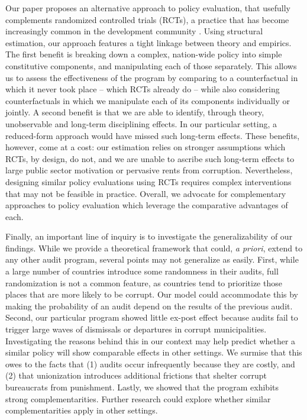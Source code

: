 {Our paper proposes an alternative approach to policy evaluation, that usefully complements randomized controlled trials (RCTs), a practice that has become increasingly common in the development community \citep{deaton2010instruments}. Using structural estimation, our approach features a tight linkage between theory and empirics. The first benefit is breaking down a complex, nation-wide policy into simple constitutive components, and manipulating each of those separately. This allows us to assess the effectiveness of the program by comparing to a counterfactual in which it never took place -- which RCTs already do -- while also considering counterfactuals in which we manipulate each of its components individually or jointly. A second benefit is that we are able to identify, through theory, unobservable and long-term disciplining effects. In our particular setting, a reduced-form approach would have missed such long-term effects. These benefits, however, come at a cost: our estimation relies on stronger assumptions which RCTs, by design, do not, and we are unable to ascribe such long-term effects to large public sector motivation or pervasive rents from corruption. Nevertheless, designing similar policy evaluations using RCTs requires complex interventions that may not be feasible in practice. Overall, we advocate for complementary approaches to policy evaluation which leverage the comparative advantages of each. 

Finally, an important line of inquiry is to investigate the generalizability of our findings. While we provide a theoretical framework that could, \emph{a priori}, extend to any other audit program, several points may not generalize as easily. First, while a large number of countries introduce some randomness in their audits, full randomization is not a common feature, as countries tend to prioritize those places that are more likely to be corrupt. Our model could accommodate this by making the probability of an audit depend on the results of the previous audit. Second, our particular program showed little ex-post effect because audits fail to trigger large waves of dismissals or departures in corrupt municipalities. Investigating the reasons behind this in our context may help predict whether a similar policy will show comparable effects in other settings. We surmise that this owes to the facts that (1) audits occur infrequently because they are costly, and (2) that unionization introduces additional frictions that shelter corrupt bureaucrats from punishment. Lastly, we showed that the program exhibits strong complementarities. Further research could explore whether similar complementarities apply in other settings. 

}
